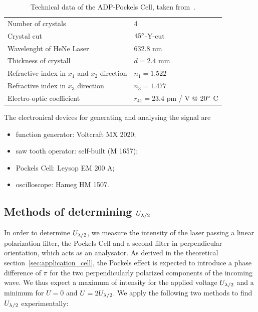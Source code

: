 \begin{table}[htdp]
    \begin{tabular}{|p{}|p{}|}
        \hline
        Number of crystals & 4 \\
        Crystal cut & $45^\circ$-Y-cut \\
        Wavelenght of HeNe Laser & 632.8 nm \\
        Thickness of crystall & $d = 2.4$ mm \\
        Refractive index in $x_1$ and $x_2$ direction & $n_1 = 1.522$  \\
        Refractive index in $x_3$ direction & $n_3 = 1.477$  \\
        Electro-optic coefficient & $r_{41} = 23.4$ pm / V @ $ 20^\circ$ C \\
        \hline
    \end{tabular}
\caption{
    Technical data of the ADP-Pockels Cell,
    taken from~\cite{versuchsanleitung}.
    }
\label{tab:pockels_technical}
\end{table}

\begin{samepage}
The electronical devices for generating and analysing the signal are 
\begin{itemize}
    \item
    function generator: Voltcraft MX 2020;
    \item
    saw tooth operator: self-built (M 1657);
    \item
    Pockels Cell: Leysop EM 200 A;
    \item
    oscilloscope: Hameg HM 1507.
\end{itemize}
\end{samepage}


\subsection{Methods of determining $U_{\lambda/2}$}
In order to determine $U_{\lambda/2}$, we measure the intensity of the laser 
passing a linear polarization filter, the Pockels Cell and a second filter 
in perpendicular orientation, which acts as an analysator. 
As derived in the theoretical section~\ref{sec:application_cell},
the Pockels effect is expected to introduce a phase difference 
of $\pi$ for the two perpendicularly polarized components of the 
incoming wave. We thus expect a maximum of intensity for the applied 
voltage $U_{\lambda/2}$ and a minimum for $U = 0$ and $U = 2U_{\lambda/2}$. 
We apply the following two methods to find $U_{\lambda/2}$ experimentally:
